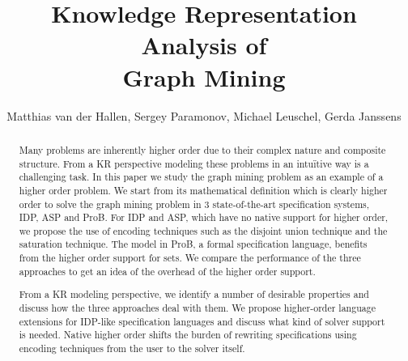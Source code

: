 \documentclass{new_tlp}
\author[]{Matthias van der Hallen, Sergey Paramonov, Michael Leuschel, Gerda Janssens}
\title{Knowledge Representation Analysis of\\ Graph Mining}
\begin{document}
\maketitle
\begin{abstract}
Many problems are inherently higher order due to their complex nature and composite structure.
From a KR perspective modeling these problems in an intu\"itive way is a challenging task.
In this paper we study the graph mining problem as an example of a higher order problem.
We start from its mathematical definition which is clearly higher
order to solve the graph mining problem in 3 state-of-the-art specification
systems, IDP, ASP and ProB.
For IDP and ASP, which have no
native support for higher order, we propose the use of encoding
techniques such as the disjoint union technique and the saturation technique.
The model in ProB, a formal specification language, benefits
from the higher order support for sets.
We compare the performance of the three approaches to get an idea of
the overhead of the higher order support.

From a KR modeling perspective, we identify a number of desirable
properties and discuss how the three approaches deal with them.
We propose higher-order language extensions for IDP-like
specification languages
and  discuss what kind of solver support is needed.
Native higher order shifts the burden of rewriting specifications using encoding techniques from the user to the solver itself.


\end{abstract}


%




%


{\tiny
}



\end{document}
